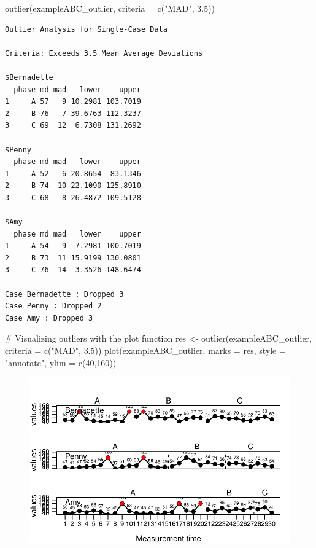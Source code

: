 \documentclass[
  letterpaper,
  DIV=11,
  numbers=noendperiod]{scrreprt}
\newenvironment{Shaded}{\begin{snugshade}}{\end{snugshade}}
\newcommand{\AttributeTok}[1]{\textcolor[rgb]{0.40,0.45,0.13}{#1}}
\newcommand{\CommentTok}[1]{\textcolor[rgb]{0.37,0.37,0.37}{#1}}
\newcommand{\DecValTok}[1]{\textcolor[rgb]{0.68,0.00,0.00}{#1}}
\newcommand{\FloatTok}[1]{\textcolor[rgb]{0.68,0.00,0.00}{#1}}
\newcommand{\FunctionTok}[1]{\textcolor[rgb]{0.28,0.35,0.67}{#1}}
\newcommand{\NormalTok}[1]{\textcolor[rgb]{0.00,0.23,0.31}{#1}}
\newcommand{\OtherTok}[1]{\textcolor[rgb]{0.00,0.23,0.31}{#1}}
\newcommand{\StringTok}[1]{\textcolor[rgb]{0.13,0.47,0.30}{#1}}
\begin{document}
\begin{Shaded}
\begin{Highlighting}[]
\FunctionTok{outlier}\NormalTok{(exampleABC\_outlier, }\AttributeTok{criteria =} \FunctionTok{c}\NormalTok{(}\StringTok{"MAD"}\NormalTok{, }\FloatTok{3.5}\NormalTok{))}
\end{Highlighting}
\end{Shaded}

\begin{verbatim}
Outlier Analysis for Single-Case Data

Criteria: Exceeds 3.5 Mean Average Deviations

$Bernadette
  phase md mad   lower    upper
1     A 57   9 10.2981 103.7019
2     B 76   7 39.6763 112.3237
3     C 69  12  6.7308 131.2692

$Penny
  phase md mad   lower    upper
1     A 52   6 20.8654  83.1346
2     B 74  10 22.1090 125.8910
3     C 68   8 26.4872 109.5128

$Amy
  phase md mad   lower    upper
1     A 54   9  7.2981 100.7019
2     B 73  11 15.9199 130.0801
3     C 76  14  3.3526 148.6474

Case Bernadette : Dropped 3 
Case Penny : Dropped 2 
Case Amy : Dropped 3 
\end{verbatim}

\begin{Shaded}
\begin{Highlighting}[]
\CommentTok{\# Visualizing outliers with the plot function}
\NormalTok{res }\OtherTok{\textless{}{-}} \FunctionTok{outlier}\NormalTok{(exampleABC\_outlier, }\AttributeTok{criteria =} \FunctionTok{c}\NormalTok{(}\StringTok{"MAD"}\NormalTok{, }\FloatTok{3.5}\NormalTok{))}
\FunctionTok{plot}\NormalTok{(exampleABC\_outlier, }\AttributeTok{marks =}\NormalTok{ res, }\AttributeTok{style =} \StringTok{"annotate"}\NormalTok{, }\AttributeTok{ylim =} \FunctionTok{c}\NormalTok{(}\DecValTok{40}\NormalTok{,}\DecValTok{160}\NormalTok{))}
\end{Highlighting}
\end{Shaded}

\begin{figure}[H]

{\centering \includegraphics{./ch_describe_manipulate_files/figure-pdf/outlier-1.pdf}

}

\end{figure}
\end{document}
